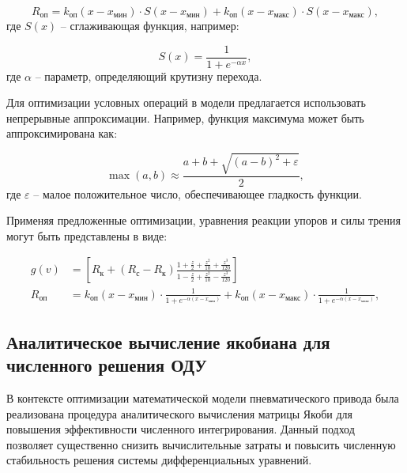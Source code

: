 \begin{equation}
    R_\text{оп} = k_\text{оп}(x - x_\text{мин})\cdot S(x - x_\text{мин}) + k_\text{оп}(x - x_\text{макс})\cdot S(x - x_\text{макс}),
\end{equation}
где $S(x)$ -- сглаживающая функция, например:

\begin{equation}
    S(x) = \frac{1}{1 + e^{-\alpha x}},
\end{equation}
где $\alpha$ -- параметр, определяющий крутизну перехода.

Для оптимизации условных операций в модели предлагается
использовать непрерывные аппроксимации. Например, функция
максимума может быть аппроксимирована как:

\begin{equation}
    \max(a, b) \approx \frac{a + b + \sqrt{(a - b)^2 + \varepsilon}}{2},
\end{equation}
где $\varepsilon$ -- малое положительное число, обеспечивающее гладкость функции.

Применяя предложенные оптимизации, уравнения реакции упоров и силы трения могут быть представлены в виде:

\begin{equation}
    \begin{alignedat}{2}
        g(v) & = \left[R_\text{к} + (R_\text{с} - R_\text{к})\frac{1 + \frac{z}{2} + \frac{z^2}{10} + \frac{z^3}{120}}{1 - \frac{z}{2} + \frac{z^2}{10} - \frac{z^3}{120}}\right] \\
        R_\text{оп} & = k_\text{оп}(x - x_\text{мин})\cdot \frac{1}{1 + e^{-\alpha(x - x_\text{мин})}} + k_\text{оп}(x - x_\text{макс})\cdot \frac{1}{1 + e^{-\alpha(x - x_\text{макс})}},
    \end{alignedat}
\end{equation}

\subsection{Аналитическое вычисление якобиана для численного решения ОДУ}\label{sec:ch2/sec5/subsec3}

В контексте оптимизации математической модели пневматического привода была реализована процедура аналитического
вычисления матрицы Якоби для повышения эффективности численного интегрирования. Данный подход позволяет
существенно снизить вычислительные затраты и повысить численную стабильность решения системы дифференциальных уравнений.

